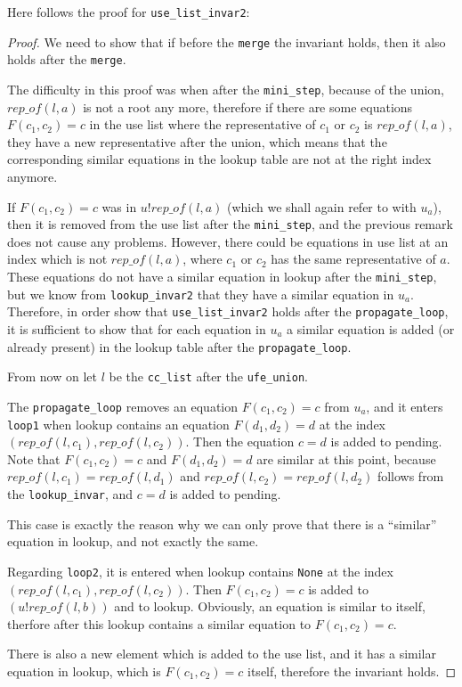 Here follows the proof for \lstinline{use_list_invar2}:

\begin{proof}
We need to show that if before the \lstinline{merge} the invariant holds, then it also holds after the \lstinline{merge}.

The difficulty in this proof was when after the \lstinline{mini_step}, because of the union, $rep\_of(l, a)$ is not a root any more, therefore if there are some equations $F(c_1, c_2) = c$ in the use list where the representative of $c_1$ or $c_2$ is $rep\_of(l,a)$, they have a new representative after the union, which means that the corresponding similar equations in the lookup table are not at the right index anymore.

If $F(c_1, c_2) = c$ was in $u ! rep\_of (l, a)$ (which we shall again refer to with $u_a$), then it is removed from the use list after the \lstinline|mini_step|, and the previous remark does not cause any problems. However, there could be equations in use list at an index which is not $rep\_of(l, a)$, where $c_1$ or $c_2$ has the same representative of $a$. These equations do not have a similar equation in lookup after the \lstinline{mini_step}, but we know from \lstinline{lookup_invar2} that they have a similar equation in $u_a$.
Therefore, in order show that \lstinline{use_list_invar2} holds after the \lstinline{propagate_loop}, it is sufficient to show that for each equation in $u_a$ a similar equation is added (or already present) in the lookup table after the \lstinline{propagate_loop}.

From now on let $l$ be the \lstinline{cc_list} after the \lstinline{ufe_union}.

The \lstinline{propagate_loop} removes an equation $F(c_1, c_2) = c$ from $u_a$, and it enters \lstinline{loop1} when lookup contains an equation $F(d_1, d_2) = d$ at the index $(rep\_of(l, c_1), rep\_of(l, c_2))$. Then the equation $c = d$ is added to pending. Note that $F(c_1, c_2) = c$ and $F(d_1, d_2) = d$ are similar at this point, because $rep\_of(l, c_1) = rep\_of(l, d_1)$ and $rep\_of(l, c_2) = rep\_of(l, d_2)$ follows from the \lstinline{lookup_invar}, and $c = d$ is added to pending.

This case is exactly the reason why we can only prove that there is a ``similar'' equation in lookup, and not exactly the same.

Regarding \lstinline{loop2}, it is entered when lookup contains \lstinline{None} at the index $(rep\_of(l, c_1), rep\_of(l, c_2))$. Then $F(c_1, c_2) = c$ is added to $(u ! rep\_of(l, b))$ and to lookup. Obviously, an equation is similar to itself, therfore after this lookup contains a similar equation to $F(c_1, c_2) = c$.

There is also a new element which is added to the use list, and it has a similar equation in lookup, which is $F(c_1, c_2) = c$ itself, therefore the invariant holds.
\end{proof}

